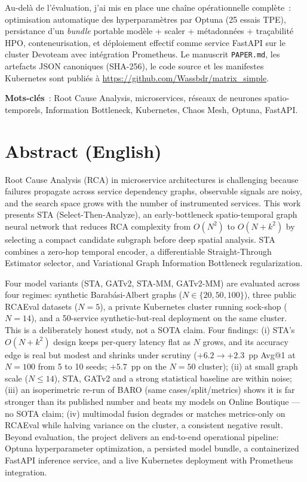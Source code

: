 \documentclass[a4paper,11pt,oneside]{report}
\begin{document}
Au-del\`a de l'\'evaluation, j'ai mis en place une cha\^ine op\'erationnelle compl\`ete~: optimisation automatique des hyperparam\`etres par Optuna (25 essais TPE), persistance d'un \emph{bundle} portable mod\`ele + scaler + m\'etadonn\'ees + tra\c{c}abilit\'e HPO, conteneurisation, et d\'eploiement effectif comme service FastAPI sur le cluster Devoteam avec int\'egration Prometheus. Le manuscrit \texttt{PAPER.md}, les artefacts JSON canoniques (SHA-256), le code source et les manifestes Kubernetes sont publi\'es \`a \url{https://github.com/Wassbdr/matrix_simple}.

\vspace{0.5cm}
\textbf{Mots-cl\'es}~: Root Cause Analysis, microservices, r\'eseaux de neurones spatio-temporels, Information Bottleneck, Kubernetes, Chaos Mesh, Optuna, FastAPI.

\chapter*{Abstract (English)}

Root Cause Analysis (RCA) in microservice architectures is challenging because failures propagate across service dependency graphs, observable signals are noisy, and the search space grows with the number of instrumented services. This work presents STA (Select-Then-Analyze), an early-bottleneck spatio-temporal graph neural network that reduces RCA complexity from $O(N^2)$ to $O(N + k^2)$ by selecting a compact candidate subgraph before deep spatial analysis. STA combines a zero-hop temporal encoder, a differentiable Straight-Through Estimator selector, and Variational Graph Information Bottleneck regularization.

Four model variants (STA, GATv2, STA-MM, GATv2-MM) are evaluated across four regimes: synthetic Barab\'asi-Albert graphs ($N \in \{20,50,100\}$), three public RCAEval datasets ($N{=}5$), a private Kubernetes cluster running sock-shop ($N{=}14$), and a 50-service synthetic-but-real deployment on the same cluster. This is a deliberately honest study, not a SOTA claim. Four findings: (i) STA's $O(N+k^2)$ design keeps per-query latency flat as $N$ grows, and its accuracy edge is real but modest and shrinks under scrutiny ($+6.2 \to +2.3$~pp Avg@1 at $N{=}100$ from 5 to 10 seeds; $+5.7$~pp on the $N{=}50$ cluster); (ii) at small graph scale ($N \le 14$), STA, GATv2 and a strong statistical baseline are within noise; (iii) an isoperimetric re-run of BARO (same cases/split/metrics) shows it is far stronger than its published number and beats my models on Online Boutique --- no SOTA claim; (iv) multimodal fusion degrades or matches metrics-only on RCAEval while halving variance on the cluster, a consistent negative result. Beyond evaluation, the project delivers an end-to-end operational pipeline: Optuna hyperparameter optimization, a persisted model bundle, a containerized FastAPI inference service, and a live Kubernetes deployment with Prometheus integration.
\end{document}
